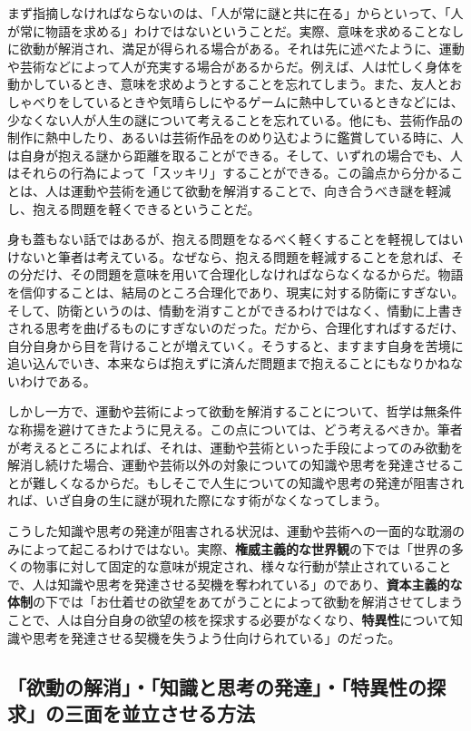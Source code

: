 まず指摘しなければならないのは、「人が常に謎と共に在る」からといって、「人が常に物語を求める」わけではないということだ。実際、意味を求めることなしに欲動が解消され、満足が得られる場合がある。それは先に述べたように、運動や芸術などによって人が充実する場合があるからだ。例えば、人は忙しく身体を動かしているとき、意味を求めようとすることを忘れてしまう。また、友人とおしゃべりをしているときや気晴らしにやるゲームに熱中しているときなどには、少なくない人が人生の謎について考えることを忘れている。他にも、芸術作品の制作に熱中したり、あるいは芸術作品をのめり込むように鑑賞している時に、人は自身が抱える謎から距離を取ることができる。そして、いずれの場合でも、人はそれらの行為によって「スッキリ」することができる。この論点から分かることは、人は運動や芸術を通じて欲動を解消することで、向き合うべき謎を軽減し、抱える問題を軽くできるということだ。

身も蓋もない話ではあるが、抱える問題をなるべく軽くすることを軽視してはいけないと筆者は考えている。なぜなら、抱える問題を軽減することを怠れば、その分だけ、その問題を意味を用いて合理化しなければならなくなるからだ。物語を信仰することは、結局のところ合理化であり、現実に対する防衛にすぎない。そして、防衛というのは、情動を消すことができるわけではなく、情動に上書きされる思考を曲げるものにすぎないのだった。だから、合理化すればするだけ、自分自身から目を背けることが増えていく。そうすると、ますます自身を苦境に追い込んでいき、本来ならば抱えずに済んだ問題まで抱えることにもなりかねないわけである。

しかし一方で、運動や芸術によって欲動を解消することについて、哲学は無条件な称揚を避けてきたように見える。この点については、どう考えるべきか。筆者が考えるところによれば、それは、運動や芸術といった手段によってのみ欲動を解消し続けた場合、運動や芸術以外の対象についての知識や思考を発達させることが難しくなるからだ。もしそこで人生についての知識や思考の発達が阻害されれば、いざ自身の生に謎が現れた際になす術がなくなってしまう。

こうした知識や思考の発達が阻害される状況は、運動や芸術への一面的な耽溺のみによって起こるわけではない。実際、\textbf{権威主義的な世界観}の下では「世界の多くの物事に対して固定的な意味が規定され、様々な行動が禁止されていることで、人は知識や思考を発達させる契機を奪われている」のであり、\textbf{資本主義的な体制}の下では「お仕着せの欲望をあてがうことによって欲動を解消させてしまうことで、人は自分自身の欲望の核を探求する必要がなくなり、\textbf{特異性}について知識や思考を発達させる契機を失うよう仕向けられている」のだった。

\subsection{「欲動の解消」・「知識と思考の発達」・「特異性の探求」の三面を並立させる方法}\label{ux6b32ux52d5ux306eux89e3ux6d88ux77e5ux8b58ux3068ux601dux8003ux306eux767aux9054ux7279ux7570ux6027ux306eux63a2ux6c42ux306eux4e09ux9762ux3092ux4e26ux7acbux3055ux305bux308bux65b9ux6cd5}

